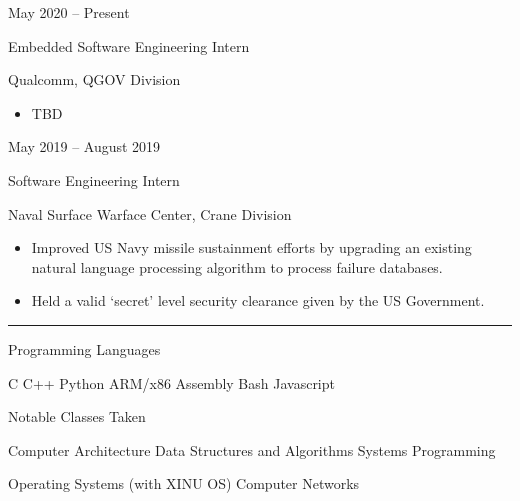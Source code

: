 \documentclass[a4paper]{article}
\newlength{\cvcolumngapwidth}
\newlength{\cvleftcolumnwidth}
\newlength{\cvrightcolumnwidth}
\newcommand{\cvsectionstyle}[1]{{\normalsize\cvsectionfont\textcolor{cvsectioncolor}{#1}}}
\newcommand{\cvtitlestyle}[1]{{\large\cvtitlefont\textcolor{cvtitlecolor}{#1}}}
\newcommand{\cvdurationstyle}[1]{{\small\cvdurationfont\textcolor{cvdurationcolor}{#1}}}
\newcommand{\cvheadingstyle}[1]{{\normalsize\cvheadingfont\textcolor{cvheadingcolor}{#1}}}
\newlength{\cvafteritemskipamount}
\newlength{\cvaftersectionskipamount}
\newlength{\cvaftertitleskipamount}
\newlength{\cvparskip}
\newcommand{\cvsection}[1]{
    \begin{minipage}[t]{\cvleftcolumnwidth}
        \raggedleft\cvsectionstyle{#1}
    \end{minipage}%
    \hspace{\cvcolumngapwidth}%
    \begin{minipage}[t]{\cvrightcolumnwidth}
        \textcolor{cvrulecolor}{\rule{\cvrightcolumnwidth}{0.3mm}}
    \end{minipage}

    \vspace{\cvaftersectionskipamount}
}
\newcommand{\cvitem}[2]{
    \begin{minipage}[t]{\cvleftcolumnwidth}
        \raggedleft #1
    \end{minipage}%
    \hspace{\cvcolumngapwidth}%
    \begin{minipage}[t]{\cvrightcolumnwidth}
        \setlength{\parskip}{\cvparskip} #2
    \end{minipage}

    \vspace{\cvafteritemskipamount}
}
\newcommand{\cvtitle}[1]{
    \cvtitlestyle{#1}

    \vspace{\cvaftertitleskipamount}
    \vspace{-\cvparskip}
}
\begin{document}
\cvitem{
    \cvdurationstyle{May 2020 -- Present}
}{
    \cvtitle{Embedded Software Engineering Intern}

    Qualcomm, QGOV Division

    \begin{itemize}[leftmargin=*]
        \item TBD
    \end{itemize}
}

\cvitem{
    \cvdurationstyle{May 2019 -- August 2019}
}{
    \cvtitle{Software Engineering Intern}

    Naval Surface Warface Center, Crane Division

    \begin{itemize}[leftmargin=*]
        \item Improved US Navy missile sustainment efforts by upgrading an existing
natural language processing algorithm to process failure databases.
        \item Held a valid ‘secret’ level security clearance given by the US Government.
    \end{itemize}
}


\cvsection{TECHNICAL SKILLS}

\cvitem{
    \cvheadingstyle{Programming Languages}
}{
      C \hspace{12mm} C++ \hspace{12mm} Python \hspace{12mm} ARM/x86 Assembly \hspace{12mm} Bash \hspace{12mm} Javascript
}

\cvitem{
    \cvheadingstyle{Notable Classes Taken}
}{
      \begin{center}
      Computer Architecture \hspace{10mm}
      Data Structures and Algorithms \hspace{10mm}
      Systems Programming

      Operating Systems (with XINU OS) \hspace{10mm}
      Computer Networks \hspace{10mm}
      \end{center}
}
\end{document}
